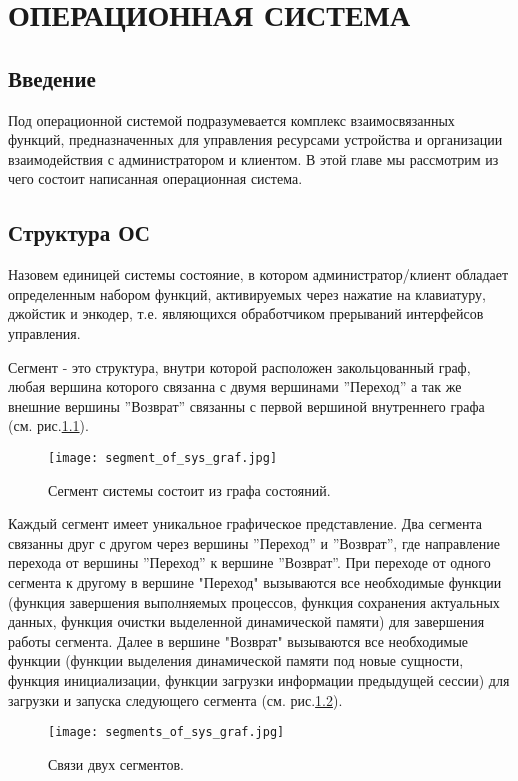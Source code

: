 \chapter{ОПЕРАЦИОННАЯ СИСТЕМА}
\section{Введение}


Под операционной системой подразумевается комплекс взаимосвязанных функций, предназначенных для управления ресурсами устройства и организации взаимодействия с администратором и клиентом.
В этой главе мы рассмотрим  из чего состоит написанная операционная система.

\section{Структура ОС}
Назовем единицей системы состояние, в котором администратор/клиент обладает определенным набором функций, активируемых через нажатие на клавиатуру, джойстик и энкодер, т.е. являющихся обработчиком прерываний интерфейсов управления.

Сегмент - это структура, внутри которой расположен закольцованный граф, любая вершина которого связанна с двумя вершинами ''Переход'' а так же внешние вершины ''Возврат'' связанны с первой вершиной внутреннего графа (см. рис.\ref{fig:segment_of_sys_graf}).
\begin{figure}[ht]
	\centering
     \texttt{[image: segment\_of\_sys\_graf.jpg]}
	\caption{Сегмент системы состоит из графа состояний.}
	\label{fig:segment_of_sys_graf}
\end{figure}

Каждый сегмент имеет уникальное графическое представление. Два сегмента связанны друг с другом через вершины ''Переход'' и ''Возврат'', где направление перехода от вершины ''Переход'' к вершине ''Возврат''. При переходе от одного сегмента к другому в вершине "Переход" вызываются все необходимые функции (функция завершения выполняемых процессов, функция сохранения актуальных данных, функция очистки выделенной динамической памяти) для завершения работы сегмента. Далее в вершине "Возврат" вызываются все необходимые функции (функции выделения динамической памяти под новые сущности, функция инициализации, функции загрузки информации предыдущей сессии) для загрузки и запуска следующего сегмента (см. рис.\ref{fig:segments_of_sys_graf}).
\begin{figure}[ht]
	\centering
     \texttt{[image: segments\_of\_sys\_graf.jpg]}
	\caption{Связи двух сегментов.}
	\label{fig:segments_of_sys_graf}
\end{figure}

